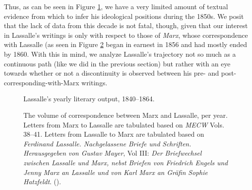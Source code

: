 Thus, as can be seen in Figure \ref{fig:lassallepubs}, we have a very limited amount of textual evidence from which to infer his ideological positions during the 1850s. We posit that the lack of data from this decade is not fatal, though, given that our interest in Lassalle's writings is only with respect to those of \textit{Marx}, whose correspondence with Lassalle (as seen in Figure \ref{fig:lassalleletters} began in earnest in 1856 and had mostly ended by 1860. With this in mind, we analyze Lassalle's trajectory not so much as a continuous path (like we did in the previous section) but rather with an eye towards whether or not a discontinuity is observed between his pre- and post-corresponding-with-Marx writings.

\begin{figure}[ht!]
    \centering
    
    \caption{Lassalle's yearly literary output, 1840--1864.}
    \label{fig:lassallepubs}
\end{figure}

\begin{figure}[ht!]
    \centering
    
    \caption{The volume of correspondence between Marx and Lassalle, per year. Letters from Marx to Lassalle are tabulated based on \textit{MECW} Vols. 38--41. Letters from Lassalle to Marx are tabulated based on \textit{Ferdinand Lassalle. Nachgelassene Briefe und Schriften. Herausgegeben von Gustav Mayer}, Vol III: \textit{Der Briefwechsel zwischen Lassalle und Marx, nebst Briefen von Friedrich Engels und Jenny Marx an Lassalle und von Karl Marx an Gräfin Sophie Hatzfeldt}. (\cite{lassalle_ferdinand_1922}).}
    \label{fig:lassalleletters}
\end{figure}
